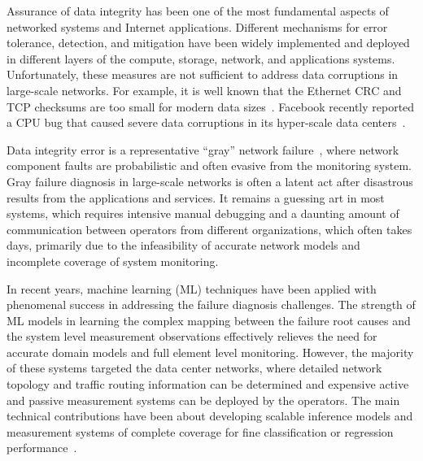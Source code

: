 Assurance of data integrity has been one of the most fundamental aspects of networked systems and Internet applications. 
Different mechanisms for error tolerance, detection, and mitigation have been widely implemented and deployed in different layers of 
the compute, storage, network, and applications systems. Unfortunately, these measures are not sufficient to address data corruptions 
in large-scale networks. For example, it is well known that the Ethernet CRC and TCP checksums are too small for 
modern data sizes~\cite{tcp:ccr2000}. Facebook recently reported a CPU bug that caused severe data corruptions in its hyper-scale data centers~\cite{facebook:cpu:2021}. 


Data integrity error is a representative ``gray'' network failure~\cite{GrayFailure:2017}, where 
network component faults are probabilistic and often evasive from the monitoring system. Gray failure diagnosis in large-scale networks 
is often a latent act after disastrous results from the applications and services. It remains a guessing art in most systems, which requires intensive 
manual debugging and a daunting amount of communication between operators 
from different organizations, which often takes days, primarily due to the infeasibility of accurate network models and 
incomplete coverage of system monitoring. 

In recent years, machine learning (ML) techniques have been applied with phenomenal success in addressing the failure diagnosis challenges.
The strength of ML models in learning the complex mapping between the failure root causes and the system level measurement 
observations effectively relieves the need for accurate domain models and full element level monitoring.  However, the majority of 
these systems targeted the data center networks, where detailed network topology and traffic routing information can be determined and 
expensive active and passive measurement systems can be deployed by the operators. The main 
technical contributions have been about developing scalable inference models and measurement systems of complete coverage for fine classification or regression performance~\cite{netbouncer:nsdi18,DeepView:NSDI18,arzani2018democratically}.

